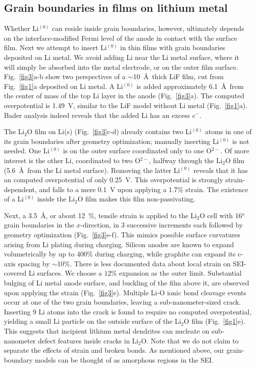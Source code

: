 \documentclass[prb,preprint,amsmath,amssymb]{revtex4}
\begin{document}
\subsection*{Grain boundaries in films on lithium metal}

Whether Li$^{(0)}$ can reside inside grain boundaries, however, ultimately
depends on the interface-modified Fermi level of the anode in contact with
the surface film.  Next we attempt to insert Li$^{(0)}$ in thin films
with grain boundaries deposited on Li metal.  We avoid adding Li near the Li
metal surface, where it will simply be absorbed into the metal electrode, or
on the outer film surface.  Fig.~\ref{fig3}a-b show two perspectives of
a $\sim$10~\AA\, thick LiF film, cut from Fig.~\ref{fig1}a deposited on Li
metal.  A Li$^{(0)}$ is added approximately 6.1~\AA\, from the center of mass
of the top Li layer in the anode (Fig.~\ref{fig3}a).  The computed
overpotential is 1.49~V, similar to the LiF model without Li metal
(Fig.~\ref{fig1}a).  Bader analysis indeed reveals that the added Li has
an excess $e^-$.

The Li$_2$O film on Li(s) (Fig.~\ref{fig3}c-d) already contains two Li$^{(0)}$
atoms in one of its grain boundaries after geometry optimization; manually
inserting Li$^{(0)}$ is not needed.  One Li$^{(0)}$ is on the outer surface
coordinated only to one O$^{2-}$.  Of more interest is the other Li,
coordinated to two O$^{2-}$, halfway through the Li$_2$O film (5.6~\AA\, from
the Li metal surface).  Removing the latter Li$^{(0)}$ reveals that it has an
computed overpotential of only 0.25~V.  This overpotential is strongly
strain-dependent, and falls to a mere 0.1~V upon applying a 1.7\% strain.  The
existence of a Li$^{(0)}$ inside the Li$_2$O film makes this film
non-passivating.

Next, a 3.5~\AA, or about 12~\%, tensile strain is applied to the Li$_2$O
cell with 16$^o$ grain boundaries in the $x$-direction, in 3 successive
increments each followed by geometry optimization (Fig.~\ref{fig3}e-f).  This
mimics possible surface curvatures arising from Li plating during charging.
Silicon anodes are known to expand volumetrically by up to 400\% during
charging, while graphite can expand its c-axis spacing by $\sim$10\%.  There is
less documented data about local strain on SEI-covered Li surfaces.  We choose
a $12\%$ expansion as the outer limit.  Substantial bulging of Li metal anode
surface, and buckling of the film above it, are observed upon applying the
strain (Fig.~\ref{fig3}e).  Multiple Li-O ionic bond cleavage events occur
at one of the two grain boundaries, leaving a sub-nanometer-sized crack.
Inserting 9 Li atoms into the crack is found to require no computed
overpotential, yielding a small Li particle on the outside surface of the
Li$_2$O film (Fig.~\ref{fig1}e).  This suggests that incipient lithium metal
dendrites can nucleate on sub-nanometer defect features inside cracks in 
Li$_2$O.  Note that we do not claim to separate the effects
of strain and broken bonds.  As mentioned above, our grain-boundary
models can be thought of as amorphous regions in the SEI.
\end{document}
